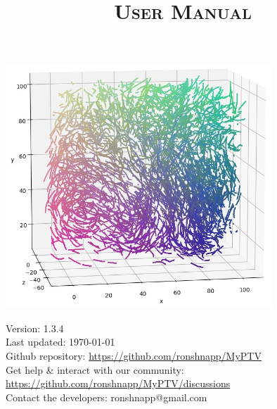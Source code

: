 \documentclass[10pt,a4paper]{article}
\title{\Huge \sffamily \textsc{\textbf{User Manual}}}
\author{}%
\date{}
\begin{document}
	
	


	
\maketitle

\thispagestyle{empty}
\vspace{2.5cm}

\begin{center}
	\includegraphics[width=10cm]{traj_image.jpg}
\end{center}

\vfill

\begin{minipage}{14cm}
	{\small \sffamily
	Version: 1.3.4 \\
	Last updated: \today \\
	Github repository: \url{https://github.com/ronshnapp/MyPTV} \\
	Get help \& interact with our community: \url{https://github.com/ronshnapp/MyPTV/discussions}\\
	Contact the developers: ronshnapp@gmail.com}
\end{minipage}



\newpage
\tableofcontents
{}
\newpage









\end{document}
